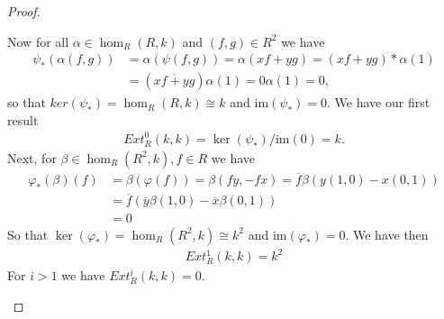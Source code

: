 \documentclass[12pt]{extarticle}
\newcommand{\im}{\text{im}}
\newcommand{\<}{\langle}
\renewcommand{\>}{\rangle}
\theoremstyle{definition}
\begin{document}
\begin{proof}
\begin{enumerate}
    Now for all $\alpha \in \hom_R(R,k)$ and $(f,g) \in R^2$ we have 
    \begin{align*}
      \psi_*(\alpha(f,g))
      &= \alpha(\psi(f,g)) = \alpha(xf+yg) = (xf+yg)*\alpha(1) \\
      &= (\overline{xf+yg}) \alpha(1) = 0 \alpha(1) = 0,
    \end{align*}
    so that $ker(\psi_*) = \hom_R(R,k) \cong k$ and $\im(\psi_*) = 0$. We have our first result
    \begin{align*}
      Ext_R^0(k,k) = \ker(\psi_*)/\im(0) =  k.
    \end{align*}
    Next, for $\beta \in \hom_R(R^2, k), f \in R$ we have 
    \begin{align*}
      \varphi_*(\beta)(f)
      &= \beta(\varphi(f)) = \beta(fy,-fx) = \overline{f}\beta(y(1,0) -x(0,1)) \\
      &= \overline{f}(\overline{y} \beta(1,0) - \overline{x}\beta(0,1)) \\
      &= 0 
    \end{align*}
    So that $\ker(\varphi_*) = \hom_R(R^2,k) \cong k^2$ and $\im(\varphi_*) = 0$. We have then
    \begin{align*}
      Ext_R^1(k,k) = k^2
    \end{align*}
    For $i>1$ we have $Ext_R^i(k,k) = 0$.


  \end{enumerate}
\end{proof}
\end{document}
